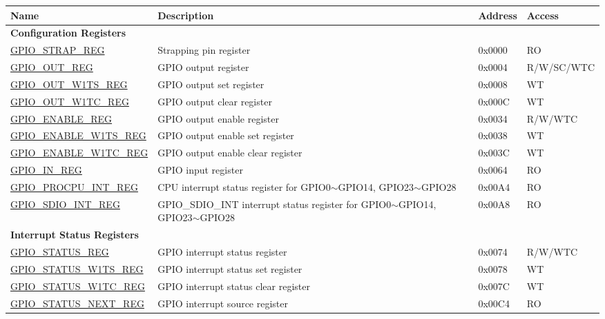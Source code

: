 \begin{longtable}{ | p{5.5cm} | p{7cm} | p{1.3cm} | p{1.9cm} | }
\hline\rowcolor{lightgray}
\textbf{Name} & \textbf{Description} &  \textbf{Address} & \textbf{Access} \\ \hline
\endhead
\multicolumn{4}{|l|}{\textbf{Configuration Registers}} \\ \hline
\hyperref[regdesc:GPIOSTRAPREG]{GPIO\_STRAP\_REG} & Strapping pin register & 0x0000 & RO \\ \hline
\hyperref[regdesc:GPIOOUTREG]{GPIO\_OUT\_REG} & GPIO output register & 0x0004 & R/W/SC/WTC \\ \hline
\hyperref[regdesc:GPIOOUTW1TSREG]{GPIO\_OUT\_W1TS\_REG} & GPIO output set register & 0x0008 & WT \\ \hline
\hyperref[regdesc:GPIOOUTW1TCREG]{GPIO\_OUT\_W1TC\_REG} & GPIO output clear register & 0x000C & WT \\ \hline
\hyperref[regdesc:GPIOENABLEREG]{GPIO\_ENABLE\_REG} & GPIO output enable register & 0x0034 & R/W/WTC \\ \hline
\hyperref[regdesc:GPIOENABLEW1TSREG]{GPIO\_ENABLE\_W1TS\_REG} & GPIO output enable set register & 0x0038 & WT \\ \hline
\hyperref[regdesc:GPIOENABLEW1TCREG]{GPIO\_ENABLE\_W1TC\_REG} & GPIO output enable clear register & 0x003C & WT \\ \hline
\hyperref[regdesc:GPIOINREG]{GPIO\_IN\_REG} & GPIO input register & 0x0064 & RO \\ \hline
\hyperref[regdesc:GPIOPROCPUINTREG]{GPIO\_PROCPU\_INT\_REG} & CPU interrupt status register for GPIO0$\sim$GPIO14, GPIO23$\sim$GPIO28 & 0x00A4 & RO \\ \hline
\hyperref[regdesc:GPIOSDIOINTREG]{GPIO\_SDIO\_INT\_REG} & GPIO\_SDIO\_INT interrupt status register for GPIO0$\sim$GPIO14, GPIO23$\sim$GPIO28 & 0x00A8 & RO \\ \hline
\multicolumn{4}{|l|}{\textbf{Interrupt Status Registers}} \\ \hline
\hyperref[regdesc:GPIOSTATUSREG]{GPIO\_STATUS\_REG} & GPIO interrupt status register & 0x0074 & R/W/WTC \\ \hline
\hyperref[regdesc:GPIOSTATUSW1TSREG]{GPIO\_STATUS\_W1TS\_REG} & GPIO interrupt status set register & 0x0078 & WT \\ \hline
\hyperref[regdesc:GPIOSTATUSW1TCREG]{GPIO\_STATUS\_W1TC\_REG} & GPIO interrupt status clear register & 0x007C & WT \\ \hline
\hyperref[regdesc:GPIOSTATUSNEXTREG]{GPIO\_STATUS\_NEXT\_REG} & GPIO interrupt source register & 0x00C4 & RO \\ \hline

\end{longtable}
